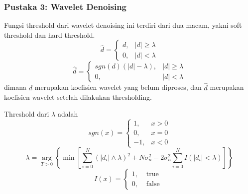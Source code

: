 \begin{frame}[allowframebreaks]
    \frametitle{Pustaka 3: Wavelet Denoising}
    \justifying

    Fungsi threshold dari wavelet denoising ini terdiri dari dua macam, yakni soft threshold dan hard threshold.
    \begin{equation}
        \hat{d}=\left\{\begin{array}{ll}
        d, & |d| \geq \lambda \\
        0, & |d|<\lambda
        \end{array}\right.
        \label{eq: 2-GPSINS-WD-hard-thres}
    \end{equation}
    \begin{equation}
        \hat{d}=\left\{\begin{array}{ll}
        sgn(d)(|d|-\lambda), & |d| \geq \lambda \\
        0, & |d|<\lambda
        \end{array}\right.
        \label{eq: 2-GPSINS-WD-soft-thres}
    \end{equation}
    dimana $d$ merupakan koefisien wavelet yang belum diproses, dan $\hat{d}$ merupakan koefisien wavelet setelah dilakukan thresholding. 
    
    Threshold dari $\lambda$ adalah
    \begin{equation}
        sgn(x)=\left\{\begin{array}{ll}
        1, & x>0 \\
        0, & x=0 \\
        -1, & x<0
        \end{array}\right.
    \end{equation}
    \begin{equation}
        \lambda=\underset{T>0}{\arg }\left\{\min \left[\sum_{i=0}^{N}\left(\left|d_{i}\right| \wedge \lambda\right)^{2}+N \sigma_{n}^{2}-2 \sigma_{n}^{2} \sum_{i=0}^{N} I\left(|d_{i}|<\lambda\right)\right]\right\}
        \label{eq: 2-GPSINS-WD-lambda}
    \end{equation}
    \begin{equation}
        I(x)=\left\{\begin{array}{ll}
        1, & \text { true } \\
        0, & \text { false }
        \end{array}\right.
    \end{equation}
\end{frame}